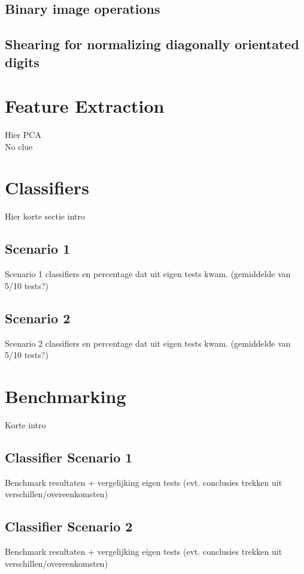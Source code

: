 \documentclass[11pt,twoside,a4paper]{article}
\begin{document}
\subsection{Binary image operations} %


\subsection{Shearing for normalizing diagonally orientated digits}



\section{Feature Extraction}

Hier PCA
\\No clue


\section{Classifiers}
Hier korte sectie intro

\subsection{Scenario 1}
Scenario 1 classifiers en percentage dat uit eigen tests kwam. (gemiddelde van 5/10 tests?)
\subsection{Scenario 2}
Scenario 2 classifiers en percentage dat uit eigen tests kwam. (gemiddelde van 5/10 tests?)



\section{Benchmarking}
Korte intro

\subsection{Classifier Scenario 1}
Benchmark resultaten + vergelijking eigen tests (evt. conclusies trekken uit verschillen/overeenkomsten)

\subsection{Classifier Scenario 2}
Benchmark resultaten + vergelijking eigen tests (evt. conclusies trekken uit verschillen/overeenkomsten)
\end{document}

